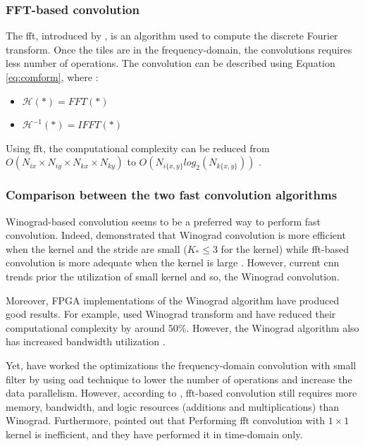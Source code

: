 \subsubsection{FFT-based convolution}
%
The \acrshort{fft}, introduced by \textcite{cooley_algorithm_1965}, is an algorithm used to compute the discrete Fourier transform. Once the tiles are in the frequency-domain, the convolutions requires less number of operations. The convolution can be described using Equation \eqref{eq:comform}, where \cite{liang_evaluating_2020}:
\begin{itemize}
    \item $\mathcal{H}(*) = FFT(*)$
    \item $\mathcal{H}^{-1}(*) = IFFT(*)$
\end{itemize}
%
Using \acrshort{fft}, the computational complexity can be reduced from $O(N_{ix} \times N_{iy} \times N_{kx} \times N_{ky})$ to $O(N_{i\{x,y\}} log_2(N_{k\{x,y\}}))$ \cite{w_smith_scientist_1997}.
%
\subsubsection{Comparison between the two fast convolution algorithms}
%
Winograd-based convolution seems to be a preferred way to perform fast convolution. Indeed, \textcite{lavin_fast_2016} demonstrated that Winograd convolution is more efficient when the kernel and the stride are small ($K_* \leq 3$ for the kernel) while \acrshort{fft}-based convolution is more adequate when the kernel is large \cite{ahmad_towards_2019, chitsaz_acceleration_2020}. However, current \acrshort{cnn} trends prior the utilization of small kernel \cite{liang_evaluating_2020, sandler_mobilenetv2_2018} and so, the Winograd convolution.

Moreover, FPGA implementations of the Winograd algorithm have produced good results. For example, \cite{aydonat_opencl_2017, liang_evaluating_2020} used Winograd transform and have reduced their computational complexity by around 50\%. However, the Winograd algorithm also has increased bandwidth utilization \cite{xiao_exploring_2017}.

Yet, \textcite{zeng_optimizing_2017, chitsaz_acceleration_2020, liang_evaluating_2020} have worked the optimizations the frequency-domain convolution with small filter by using \acrfull{oad} technique \cite{w_smith_scientist_1997} to lower the number of operations and increase the data parallelism. However, according to \textcite{liang_evaluating_2020, podili_fast_2017}, \acrshort{fft}-based convolution still requires more memory, bandwidth, and logic resources (additions and multiplications) than Winograd. Furthermore, \textcite{zhang_caffeine_2016} pointed out that Performing \acrshort{fft} convolution with $1 \times 1$ kernel is inefficient, and they have performed it in time-domain only.
